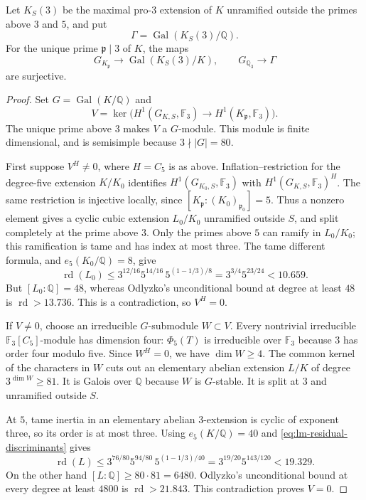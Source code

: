 \begin{theorem}
\label{thm:lm-fifteen-source}
Let $K_S(3)$ be the maximal pro-$3$ extension of $K$
unramified outside the primes above $3$ and $5$, and put
\[
 \Gamma=\operatorname{Gal}(K_S(3)/\mathbb Q).
\]
For the unique prime $\mathfrak p\mid3$ of $K$, the maps
\[
 G_{K_{\mathfrak p}}\longrightarrow
 \operatorname{Gal}(K_S(3)/K),\qquad
 G_{\mathbb Q_3}\longrightarrow\Gamma
\]
are surjective.
\end{theorem}
\begin{proof}
Set $G=\operatorname{Gal}(K/\mathbb Q)$ and
\[
 V=\ker\bigl(H^1(G_{K,S},\mathbb F_3)
       \longrightarrow H^1(K_{\mathfrak p},\mathbb F_3)\bigr).
\]
The unique prime above $3$ makes $V$ a $G$-module.  This
module is finite dimensional, and is semisimple because
$3\nmid|G|=80$.

First suppose $V^H\ne0$, where $H=C_5$ is as above.
Inflation--restriction for the degree-five extension
$K/K_0$ identifies $H^1(G_{K_0,S},\mathbb F_3)$ with
$H^1(G_{K,S},\mathbb F_3)^H$.  The same restriction is
injective locally, since $[K_{\mathfrak p}:(K_0)_{\mathfrak p_0}]=5$.
Thus a nonzero element gives a cyclic cubic extension
$L_0/K_0$ unramified outside $S$, and split completely
at the prime above $3$.
Only the primes above $5$ can ramify in $L_0/K_0$;
this ramification is tame and has index at most three.
The tame different formula, and $e_5(K_0/\mathbb Q)=8$,
give
\[
 \operatorname{rd}(L_0)
 \le 3^{12/16}5^{14/16}\,5^{(1-1/3)/8}
 =3^{3/4}5^{23/24}<10.659.
\]
But $[L_0:\mathbb Q]=48$, whereas Odlyzko's unconditional
bound at degree at least $48$ is $\operatorname{rd}>13.736$.
This is a contradiction, so $V^H=0$.

If $V\ne0$, choose an irreducible $G$-submodule $W\subset V$.
Every nontrivial irreducible $\mathbb F_3[C_5]$-module has
dimension four: $\Phi_5(T)$ is irreducible over $\mathbb F_3$
because $3$ has order four modulo five.
Since $W^H=0$, we have $\dim W\ge4$.
The common kernel of the characters in $W$ cuts out an
elementary abelian extension $L/K$ of degree
$3^{\dim W}\ge81$.  It is Galois over $\mathbb Q$ because
$W$ is $G$-stable.  It is split at $3$ and unramified
outside $S$.

At $5$, tame inertia in an elementary abelian $3$-extension
is cyclic of exponent three, so its order is at most three.
Using $e_5(K/\mathbb Q)=40$ and
\eqref{eq:lm-residual-discriminants} gives
\[
 \operatorname{rd}(L)
 \le 3^{76/80}5^{94/80}\,5^{(1-1/3)/40}
 =3^{19/20}5^{143/120}<19.329.
\]
On the other hand $[L:\mathbb Q]\ge80\cdot81=6480$.
Odlyzko's unconditional bound at every degree at least
$4800$ is $\operatorname{rd}>21.843$.
This contradiction proves $V=0$.


\end{proof}
